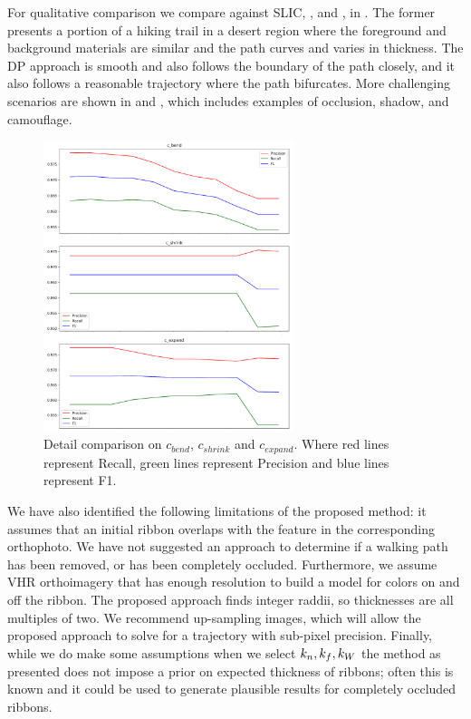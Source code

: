 For qualitative comparison we compare against \ac{SLIC}, \ActiveContours{}, and \GrabCut{}, in
. The former presents a portion of a hiking trail in a desert region where the foreground and background materials are similar and the path curves and varies in thickness. The \ac{DP} approach is smooth and also follows the boundary of the path closely, and it also follows a reasonable trajectory where the path bifurcates. More challenging scenarios are shown in  and , which includes examples of occlusion, shadow, and camouflage.  

\begin{figure}[H]
    \centering
    \includegraphics[width=0.65\textwidth]{Figures/prf.png}
    \caption[Parameters Evaluation]{Detail comparison on $c_{bend}$, $c_{shrink}$ and $c_{expand}$.
     Where red lines represent Recall, green lines represent Precision and blue lines represent F1.}
    \label{fig:change_on_recall}
\end{figure}

We have also identified the following limitations of the proposed method: it assumes that an initial ribbon overlaps with the feature in the corresponding orthophoto. 
We have not suggested an approach to determine if a walking path has been removed, or has been completely occluded. Furthermore, we assume \ac{VHR} orthoimagery that has enough resolution to build a model for colors on and off the ribbon. 
The proposed approach finds integer raddii, so thicknesses are all multiples of two. 
We recommend up-sampling images, which will allow the proposed approach to solve for a trajectory with sub-pixel precision. 
Finally, while we do make some assumptions when we select $k_n{}, k_f{}, k_W{}$ the method as presented does not impose a prior on expected thickness of ribbons; often this is known and it could be used to generate plausible results for completely occluded ribbons.

